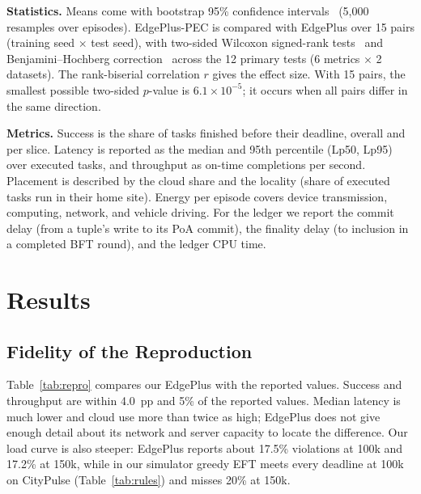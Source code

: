 \documentclass[11pt,journal,onecolumn]{IEEEtran}
\begin{document}
\textbf{Statistics.} Means come with bootstrap 95\% confidence intervals~\cite{efron} (5,000 resamples over episodes). EdgePlus-PEC is compared with EdgePlus over 15 pairs (training seed $\times$ test seed), with two-sided Wilcoxon signed-rank tests~\cite{wilcoxon} and Benjamini--Hochberg correction~\cite{bh} across the 12 primary tests (6 metrics $\times$ 2 datasets). The rank-biserial correlation $r$ gives the effect size. With 15 pairs, the smallest possible two-sided $p$-value is $6.1\times10^{-5}$; it occurs when all pairs differ in the same direction.

\textbf{Metrics.} Success is the share of tasks finished before their deadline, overall and per slice. Latency is reported as the median and 95th percentile (Lp50, Lp95) over executed tasks, and throughput as on-time completions per second. Placement is described by the cloud share and the locality (share of executed tasks run in their home site). Energy per episode covers device transmission, computing, network, and vehicle driving. For the ledger we report the commit delay (from a tuple's write to its PoA commit), the finality delay (to inclusion in a completed BFT round), and the ledger CPU time.

\section{Results}
\label{sec:results}

\subsection{Fidelity of the Reproduction}
Table~\ref{tab:repro} compares our EdgePlus with the reported values. Success and throughput are within 4.0~pp and 5\% of the reported values. Median latency is much lower and cloud use more than twice as high; EdgePlus does not give enough detail about its network and server capacity to locate the difference. Our load curve is also steeper: EdgePlus reports about 17.5\% violations at 100k and 17.2\% at 150k, while in our simulator greedy EFT meets every deadline at 100k on CityPulse (Table~\ref{tab:rules}) and misses 20\% at 150k.
\end{document}
